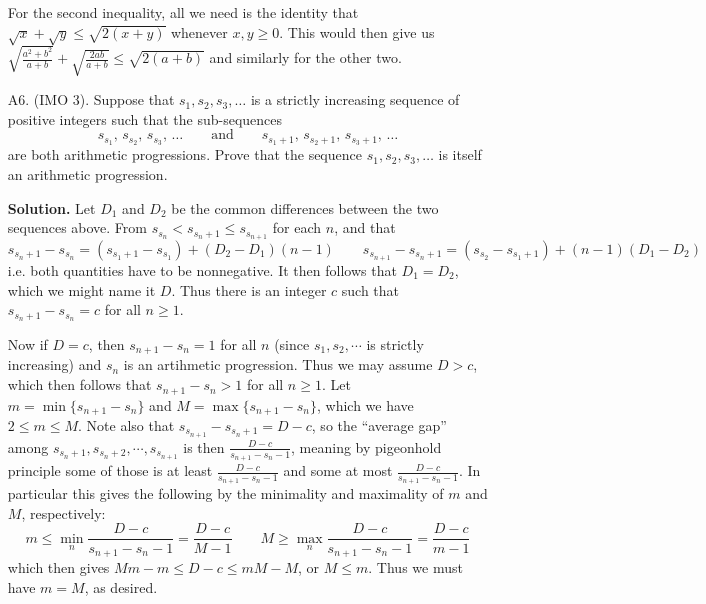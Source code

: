 \documentclass[11pt,a4paper]{article}
\begin{document}
\begin{enumerate}
	    For the second inequality, all we need is the identity that $\sqrt{x}+\sqrt{y}\le \sqrt{2(x+y)}$ whenever $x, y\ge 0$. 
	    This would then give us 
	    $\sqrt{\frac{a^2+b^2}{a+b}} + \sqrt{\frac{2ab}{a+b}}\le \sqrt{2(a+b)}$ and similarly for the other two. 
		
		\item [A6.]
		(IMO 3). 
		Suppose that $ s_1,s_2,s_3, \ldots$ is a strictly increasing sequence of positive integers such that the sub-sequences\[s_{s_1},\, s_{s_2},\, s_{s_3},\, \ldots\qquad\text{and}\qquad s_{s_1+1},\, s_{s_2+1},\, s_{s_3+1},\, \ldots\]are both arithmetic progressions. Prove that the sequence $ s_1, s_2, s_3, \ldots$ is itself an arithmetic progression.
		
		\textbf{Solution.} 
		Let $D_1$ and $D_2$ be the common differences between the two sequences above. 
		From $s_{s_n} < s_{s_n+1}\le s_{s_{n+1}}$ for each $n$, and that 
		\[
		 s_{s_n+1} - s_{s_n} = (s_{s_1+1} - s_{s_1}) + (D_2 - D_1)(n - 1)
		 \qquad 
		 s_{s_{n+1}} -  s_{s_n+1} = (s_{s_{2}} -  s_{s_1+1}) + (n - 1)(D_1 - D_2)
		\]
		i.e. both quantities have to be nonnegative. It then follows that $D_1=D_2$, which we might name it $D$. 
		Thus there is an integer $c$ such that $s_{s_n+1} - s_{s_n} = c$ for all $n\ge 1$. 
		
		Now if $D = c$, then $s_{n+1}-s_n = 1$ for all $n$ (since $s_1, s_2, \cdots$ is strictly increasing) and $s_n$ is an artihmetic progression. 
		Thus we may assume $D > c$, which then follows that $s_{n + 1} - s_n > 1$ for all $n\ge 1$. 
		Let $m=\min\{s_{n+1}-s_n\}$ and $M = \max\{s_{n+1}-s_n\}$, which we have $2\le m\le M$. 
		Note also that $s_{s_{n+1}} - s_{s_n + 1} = D - c$, 
		so the ``average gap'' among $s_{s_n+1}, s_{s_n+2}, \cdots, s_{s_{n+1}}$ is then 
		$\frac{D-c}{s_{n + 1} - s_n - 1}$, 
		meaning by pigeonhold principle some of those is at least $\frac{D-c}{s_{n + 1} - s_n - 1}$ and some at most $\frac{D-c}{s_{n + 1} - s_n - 1}$. 
		In particular this gives the following by the minimality and maximality of $m$ and $M$, respectively: 
		\[
		m\le \min_n \frac{D-c}{s_{n + 1} - s_n - 1} = \frac{D - c}{M - 1}
		\qquad 
		M\ge \max_n \frac{D-c}{s_{n + 1} - s_n - 1} = \frac{D - c}{m - 1}
		\]
		which then gives $Mm - m\le D - c \le mM - M$, or $M\le m$. 
		Thus we must have $m = M$, as desired. 
		
	\end{enumerate}
    
\end{document}
